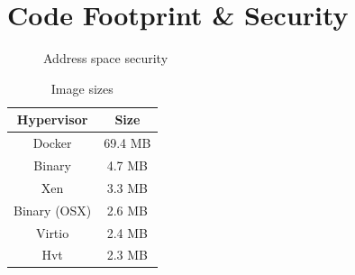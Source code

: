\section{Code Footprint \& Security}


\begin{figure}[htbp]
    \centering
    \hfill
    \caption{Address space security}
  \end{figure}


  \begin{table}[htpb]
    \caption[Image Sizes]{Image sizes}\label{tab:sizes}
    \centering
    \begin{tabular}{ |c|c| }
      \toprule
        Hypervisor & Size \\
      \midrule
      Docker & 69.4 MB \\
       
        \hline
        Binary & 4.7 MB \\
      \hline
      Xen &  3.3 MB\\
      \hline 
      Binary (OSX) & 2.6 MB\\
      \hline
      Virtio & 2.4 MB \\
      \hline
        Hvt & 2.3 MB\\
      \bottomrule
    \end{tabular}
  \end{table}